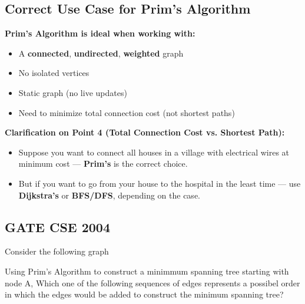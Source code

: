 \documentclass[a4paper,14pt]{extarticle}
\begin{document}
\vspace{1em}

\subsection{Correct Use Case for Prim's Algorithm}
\textbf{Prim's Algorithm is ideal when working with:}
\begin{itemize}
    \item A \textbf{connected}, \textbf{undirected}, \textbf{weighted} graph
    \item No isolated vertices
    \item Static graph (no live updates)
    \item Need to minimize total connection cost (not shortest paths)
\end{itemize}

\vspace{1em}
\textbf{Clarification on Point 4 (Total Connection Cost vs. Shortest Path):}
\begin{itemize}
    \item Suppose you want to connect all houses in a village with electrical wires at minimum cost — \textbf{Prim's} is the correct choice.
    \item But if you want to go from your house to the hospital in the least time — use \textbf{Dijkstra's} or \textbf{BFS/DFS}, depending on the case.
\end{itemize}



\subsection{GATE CSE 2004}
Consider the following graph



Using Prim's Algorithm to construct a minimmum spanning tree starting with node A, Which
one of the following sequences of edges represents a possibel order in which
the edges would be added to construct the minimum spanning tree?
\end{document}
